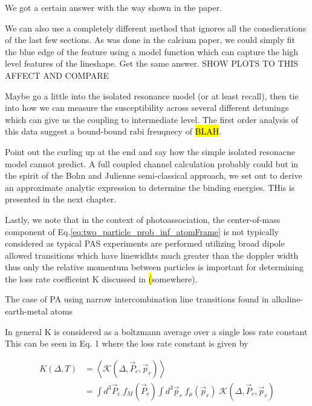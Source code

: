 We got a certain answer with the way shown in the paper.

We can also use a completely different method that ignores all the consdierations of the last few sections. As was done in the calcium paper, we could simply fit the blue edge of the feature using a model function which can capture the high level features of the lineshape. Get the same answer. SHOW PLOTS TO THIS AFFECT AND COMPARE



Maybe go a little into the isolated resonance model (or at least recall), then tie into how we can measure the susceptibility across several different detunings which can give us the coupling to intermediate level. The first order analysis of this data suggest a bound-bound rabi freuqnecy of \hl{BLAH}. 

Point out the curling up at the end and say how the simple isolated resonacne model cannot predict. A full coupled channel calculation probably could but in the spirit of the Bohn and Julienne semi-classical approach, we set out to derive an approximate analytic expression to determine the binding energies. THis is presented in the next chapter.








Lastly, we note that in the context of photoassociation, the center-of-mass component of Eq.\ref{eq:two_particle_prob_inf_atomFrame} is not typically considered as typical PAS experiments are performed utilizing broad dipole allowed transitions which have linewidhts much greater than the doppler width thus only the relative momentum between particles is important for determining the loss rate coefficeint K discussed in \hl(somewhere). 



The case of PA using narrow intercombination line transitions found in alkaline-earth-metal atoms 


In general K is considered as a boltzmann average over a single loss rate constant
This can be seen in \cite{Ciuryo2004} Eq. 1 where the loss rate constant is given by

\begin{equation}
\begin{split}
\label{eq:ciuryo04_eq1}
		 K(\Delta,T) &= \left\langle\mathcal{K}(\Delta,\vec{P}_c,\vec{p}_r)\right\rangle \\
		 &= \int d^3\vec{P}_c \; f_M(\vec{P}_c) \int d^3\vec{p}_r \; f_{\mu}(\vec{p}_r) \; \mathcal{K}(\Delta,\vec{P}_c,\vec{p}_r)
\end{split}
\end{equation}



